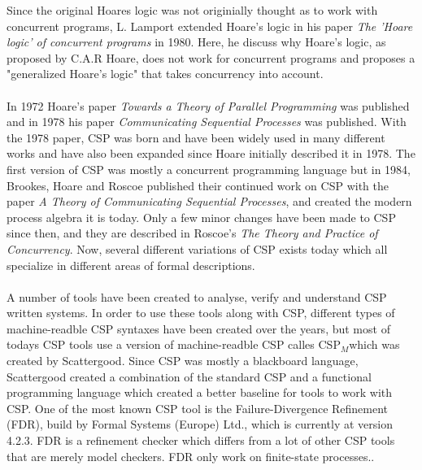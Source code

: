 \documentclass[a4paper]{report}
\newcommand{\cspm}{CSP$_M$}
\begin{document}
Since the original Hoares logic was not originially thought as to work with concurrent programs, L. Lamport extended Hoare's logic in his paper \textit{The 'Hoare logic' of concurrent programs}\cite{Lamport1980} in 1980. Here, he discuss why Hoare's logic, as proposed by C.A.R Hoare, does not work for concurrent programs and proposes a "generalized Hoare's logic" that takes concurrency into account. \\\\
In 1972 Hoare's paper \textit{Towards a Theory of Parallel Programming} was published  and in 1978 his paper \textit{Communicating Sequential Processes} was published. With the 1978 paper, CSP was born and have been widely used in many different works and have also been expanded since Hoare initially described it in 1978. The first version of CSP was mostly a concurrent programming language but in 1984, Brookes, Hoare and Roscoe published their continued work on CSP with the paper \textit{A Theory of Communicating Sequential Processes}\cite{Brookes1984}, and created the modern process algebra it is today. Only a few minor changes have been made to CSP since then, and they are described in Roscoe's \textit{The Theory and Practice of Concurrency}\cite{Roscoe1997}. Now, several different variations of CSP exists today which all specialize in different areas of formal descriptions.\\\\
A number of tools have been created to analyse, verify and understand CSP written systems. In order to use these tools along with CSP, different types of machine-readble CSP syntaxes have been created over the years, but most of todays CSP tools use a version of machine-readble CSP calles \cspm which was created by Scattergood\cite{Scattergood1998}. Since CSP was mostly a blackboard language, Scattergood created a combination of the standard CSP and a functional programming language which created a better baseline for tools to work with CSP. One of the most known CSP tool is the Failure-Divergence Refinement (FDR), build by Formal Systems (Europe) Ltd., which is currently at version 4.2.3\cite{fdr}. FDR is a refinement checker which differs from a lot of other CSP tools that are merely model checkers. FDR only work on finite-state processes..\\ 
\end{document}
